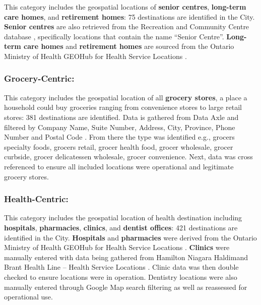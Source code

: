 \documentclass[
  super,
  preprint,
  3p]{elsarticle}
\begin{document}
This category includes the geospatial locations of \textbf{senior
centres}, \textbf{long-term care homes}, and \textbf{retirement homes}:
75 destinations are identified in the City. \textbf{Senior centres} are
also retrieved from the Recreation and Community Centre database
\citep{opendatahamiltonRecreationCommunityCentres2022}, specifically
locations that contain the name ``Senior Centre''. \textbf{Long-term
care homes} and \textbf{retirement homes} are sourced from the Ontario
Ministry of Health GEOHub for Health Service Locations
\citep{ontarioministryofhealthgeohubMinistryHealthService2023}.

\hypertarget{grocery-centric}{%
\subsubsection{Grocery-Centric:}\label{grocery-centric}}

This category includes the geospatial location of all \textbf{grocery
stores}, a place a household could buy groceries ranging from
convenience stores to large retail stores: 381 destinations are
identified. Data is gathered from Data Axle and filtered by Company
Name, Suite Number, Address, City, Province, Phone Number and Postal
Code \citep{axledataConsumerData2023}. From there the type was
identified e.g., grocers specialty foods, grocers retail, grocer health
food, grocer wholesale, grocer curbside, grocer delicatessen wholesale,
grocer convenience. Next, data was cross referenced to ensure all
included locations were operational and legitimate grocery stores.

\hypertarget{health-centric}{%
\subsubsection{Health-Centric:}\label{health-centric}}

This category includes the geospatial location of health destination
including \textbf{hospitals}, \textbf{pharmacies}, \textbf{clinics}, and
\textbf{dentist offices}: 421 destinations are identified in the City.
\textbf{Hospitals} and \textbf{pharmacies} were derived from the Ontario
Ministry of Health GEOHub for Health Service Locations
\citep{ontarioministryofhealthgeohubMinistryHealthService2023}.
\textbf{Clinics} were manually entered with data being gathered from
Hamilton Niagara Haldimand Brant Health Line -- Health Service Locations
\citep{hamiltonniagarahaldimandbranthealthlineWalkInMedicalClinics2023}.
Clinic data was then double checked to ensure locations were in
operation. Dentistry locations were also manually entered through Google
Map search filtering as well as reassessed for operational use.
\end{document}
